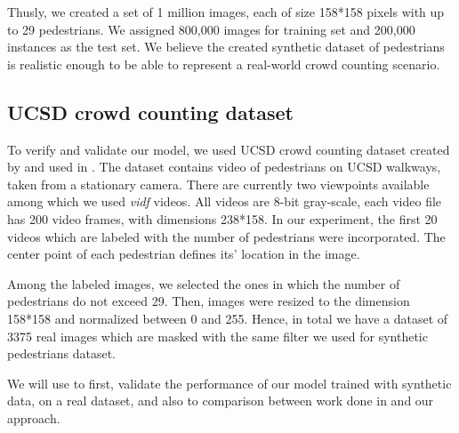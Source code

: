 \noindent Thusly, we created a set of 1 million images, each of size 158*158 pixels with up to 29 pedestrians. We assigned 800,000 images for training set and 200,000 instances as the test set. We believe the created synthetic dataset of pedestrians is realistic enough to be able to represent a real-world crowd counting scenario.

\subsection{UCSD crowd counting dataset}

To verify and validate our model, we used UCSD crowd counting dataset created by \citeauthor*{chan2008privacy} and used in \cite{chan2008privacy,chan2009bayesian,chan2012counting}. The dataset contains video of pedestrians on UCSD walkways, taken from a stationary camera. There are currently two  viewpoints available among which we used \textit{vidf} videos. All videos are 8-bit gray-scale, each video file has 200 video frames, with dimensions 238*158. In our experiment, the first 20 videos which are labeled with the number of pedestrians were incorporated. The center point of each pedestrian defines its' location in the image. 

\indent Among the labeled images, we selected the ones in which the number of pedestrians do not exceed 29. Then, images were resized to the dimension 158*158 and normalized between 0 and 255. Hence, in total we have a dataset of 3375 real images which are masked with the same filter we used for synthetic pedestrians dataset. 

\indent We will use to first, validate the performance of our model trained with synthetic data, on a real dataset, and also to comparison between work done in \cite{chan2008privacy} and our approach. 